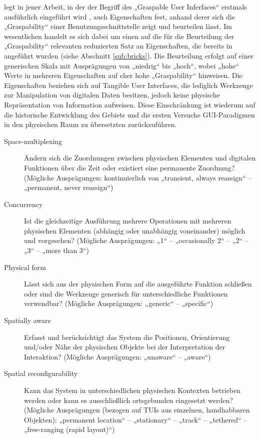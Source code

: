 \citeauthor{Fitzmaurice96} legt in jener Arbeit, in der der Begriff des „Graspable User Inferfaces“ erstmals ausführlich eingeführt wird \citep{Fitzmaurice96}, auch Eigenschaften fest, anhand derer sich die „Graspability“ einer Benutzungsschnittstelle zeigt und beurteilen lässt. Im wesentlichen handelt es sich dabei um einen auf die für die Beurteilung der „Graspability“ relevanten reduzierten Satz an Eigenschaften, die bereits in \citep{Fitzmaurice95} angeführt wurden (siehe Abschnitt \ref{sub:bricks}). Die Beurteilung erfolgt auf einer generischen Skala mit Ausprägungen von „niedrig“ bis „hoch“, wobei „hohe“ Werte in mehreren Eigenschaften auf eher hohe „Graspability“ hinweisen. Die Eigenschaften beziehen sich auf Tangible User Interfaces, die lediglich Werkzeuge zur Manipulation von digitalen Daten besitzen, jedoch keine physische Repräsentation von Information aufweisen. Diese Einschränkung ist wiederum auf die historische Entwicklung des Gebiets und die ersten Versuche GUI-Paradigmen in den physischen Raum zu übersetzten zurückzuführen.

\begin{description}
	\item[Space-multiplexing] Ändern sich die Zuordnungen zwischen physischen Elementen und digitalen Funktionen über die Zeit oder existiert eine permanente Zuordnung? (Mögliche Ausprägungen: kontinuierlich von „transient, always reassign“ -- „permanent, never reassign“)
	\item[Concurrency] Ist die gleichzeitige Ausführung mehrere Operationen mit mehreren physischen Elementen (abhängig oder unabhängig voneinander) möglich und vorgesehen? (Mögliche Ausprägungen: „1“ -- „occasionally 2“ -- „2“ -- „3“ -- „more than 3“)
	\item[Physical form] Lässt sich aus der physischen Form auf die ausgeführte Funktion schließen oder sind die Werkzeuge generisch für unterschiedliche Funktionen verwendbar? (Mögliche Ausprägungen: „generic“ -- „specific“) 
	\item[Spatially aware] Erfasst und berücksichtigt das System die Positionen, Orientierung und/oder Nähe der physischen Objekte bei der Interpretation der Interaktion? (Mögliche Ausprägungen: „unaware“ -- „aware“)
	\item[Spatial reconfigurability] Kann das System in unterschiedlichen physischen Kontexten betrieben werden oder kann es ausschließlich ortsgebunden eingesetzt werden? (Mögliche Ausprägungen (bezogen auf \glspl{TUI} aus einzelnen, handhabbaren Objekten): „permanent location“ -- „stationary“ -- „track“ -- „tethered“ -- „free-ranging (rapid layout)“)
\end{description}

